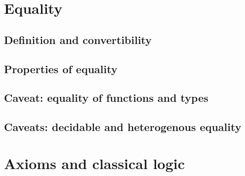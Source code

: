 \documentclass{beamer}
\begin{document}
\section{Equality}

\subsection{Definition and convertibility}



\subsection{Properties of equality}


\subsection{Caveat: equality of functions and types}


\subsection{Caveats: decidable and heterogenous equality}

\section{Axioms and classical logic}
\end{document}
